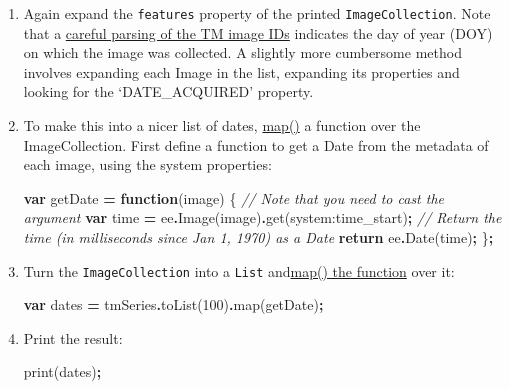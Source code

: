 \documentclass[
]{article}
\newenvironment{Shaded}{\begin{snugshade}}{\end{snugshade}}
\newcommand{\CommentTok}[1]{\textcolor[rgb]{0.56,0.35,0.01}{\textit{#1}}}
\newcommand{\ControlFlowTok}[1]{\textcolor[rgb]{0.13,0.29,0.53}{\textbf{#1}}}
\newcommand{\DecValTok}[1]{\textcolor[rgb]{0.00,0.00,0.81}{#1}}
\newcommand{\FunctionTok}[1]{\textcolor[rgb]{0.00,0.00,0.00}{#1}}
\newcommand{\KeywordTok}[1]{\textcolor[rgb]{0.13,0.29,0.53}{\textbf{#1}}}
\newcommand{\NormalTok}[1]{#1}
\newcommand{\OperatorTok}[1]{\textcolor[rgb]{0.81,0.36,0.00}{\textbf{#1}}}
\newcommand{\StringTok}[1]{\textcolor[rgb]{0.31,0.60,0.02}{#1}}
\begin{document}
\begin{enumerate}
\def\labelenumi{\arabic{enumi}.}
\item
  Again expand the \texttt{features} property of the printed \texttt{ImageCollection}. Note that a \href{http://landsat.usgs.gov/naming_conventions_scene_identifiers.php}{careful parsing of the TM image IDs} indicates the day of year (DOY) on which the image was collected. A slightly more cumbersome method involves expanding each Image in the list, expanding its properties and looking for the `DATE\_ACQUIRED' property.
\item
  To make this into a nicer list of dates, \href{https://en.wikipedia.org/wiki/Map_(higher-order_function)}{map()} a function over the ImageCollection. First define a function to get a Date from the metadata of each image, using the system properties:

\begin{Shaded}
\begin{Highlighting}[]
\KeywordTok{var}\NormalTok{ getDate }\OperatorTok{=} \KeywordTok{function}\NormalTok{(image) \{}
\CommentTok{// Note that you need to cast the argument}
\KeywordTok{var}\NormalTok{ time }\OperatorTok{=}\NormalTok{ ee}\OperatorTok{.}\FunctionTok{Image}\NormalTok{(image)}\OperatorTok{.}\FunctionTok{get}\NormalTok{(}\StringTok{\textquotesingle{}system:time\_start\textquotesingle{}}\NormalTok{)}\OperatorTok{;}
\CommentTok{// Return the time (in milliseconds since Jan 1, 1970) as a Date}
\ControlFlowTok{return}\NormalTok{ ee}\OperatorTok{.}\FunctionTok{Date}\NormalTok{(time)}\OperatorTok{;}
\NormalTok{\}}\OperatorTok{;}
\end{Highlighting}
\end{Shaded}
\item
  Turn the \texttt{ImageCollection} into a \texttt{List} and\href{https://developers.google.com/earth-engine/getstarted\#mapping-what-to-do-instead-of-a-for-loop}{map() the function} over it:

\begin{Shaded}
\begin{Highlighting}[]
\KeywordTok{var}\NormalTok{ dates }\OperatorTok{=}\NormalTok{ tmSeries}\OperatorTok{.}\FunctionTok{toList}\NormalTok{(}\DecValTok{100}\NormalTok{)}\OperatorTok{.}\FunctionTok{map}\NormalTok{(getDate)}\OperatorTok{;}
\end{Highlighting}
\end{Shaded}
\item
  Print the result:

\begin{Shaded}
\begin{Highlighting}[]
\FunctionTok{print}\NormalTok{(dates)}\OperatorTok{;}
\end{Highlighting}
\end{Shaded}
\end{enumerate}
\end{document}

